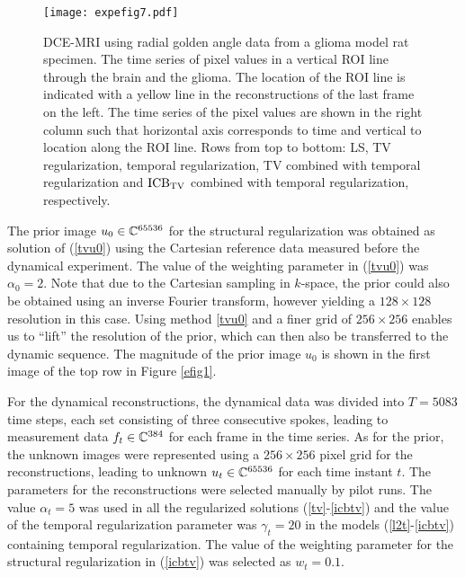 \begin{figure}[ht!]
\centerline{\texttt{[image: expefig7.pdf]}}
\caption{DCE-MRI using radial golden angle data from a glioma model rat specimen. The time series of pixel values in a vertical ROI line through the brain and the glioma. The 
location of the ROI line is indicated with a yellow line in the reconstructions of the last frame on the left. The time series of the pixel values are shown in the right column such that horizontal axis corresponds to time and vertical to location along the ROI line. Rows from top to bottom: 
LS, TV regularization, temporal regularization, TV combined with temporal regularization and $\mathrm{ICB}_{\mathrm{TV}}$ combined with  temporal regularization, respectively.}
\label{efig3}
\end{figure}

The prior image $u_0 \in \mathbb{C}^{65536}$ for the structural regularization was 
obtained as solution of (\ref{tvu0}) using the Cartesian reference data measured before the dynamical experiment. 
The value of the weighting parameter in (\ref{tvu0}) was $\alpha_0 = 2$. 
Note that due to the Cartesian sampling in $k$-space, the prior could also be obtained using an inverse Fourier transform, however yielding a $128 \times 128$ resolution in this case. 
Using method \eqref{tvu0} and a finer grid of $256 \times 256$ enables us to ``lift'' the resolution of the prior, which can then also be transferred to the dynamic sequence.
The magnitude of the prior image $u_0$ is shown in the first image of the top row in Figure \ref{efig1}. 

For the dynamical reconstructions, the dynamical data was divided into 
$T=5083$ time steps, 
each set consisting of three consecutive spokes, leading to measurement data $f_t \in \mathbb{C}^{384}$ for each frame in the time series.  
As for the prior, the unknown images were 
represented using a $256 \times 256$ pixel grid for the reconstructions, leading to unknown $u_t \in \mathbb{C}^{65536}$ for each time instant $t$. 
The parameters for the reconstructions were selected manually by pilot runs. The value  
$\alpha_t = 5$ was used in all the regularized solutions (\ref{tv}-\ref{icbtv}) and the value of the temporal regularization parameter was $\gamma_t = 20$ in the models (\ref{l2t}-\ref{icbtv}) containing temporal regularization. The value of the weighting parameter for the structural regularization in (\ref{icbtv}) was selected as $w_t = 0.1$. 

